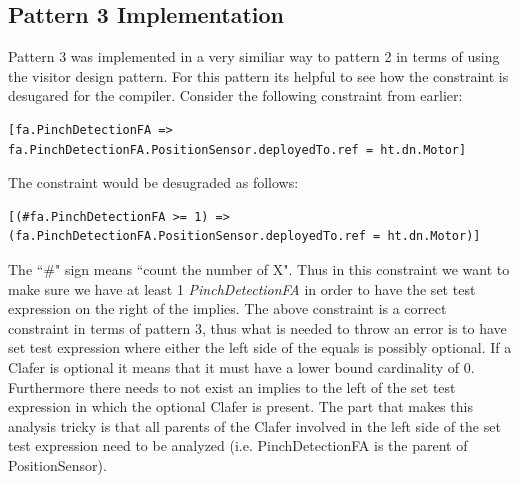 \documentclass[10pt,oneside]{IEEEtran}
\begin{document}
\subsection{Pattern 3 Implementation}
Pattern 3 was implemented in a very similiar way to pattern 2 in terms of using the visitor design pattern. For this pattern its helpful to see how the constraint is desugared for the compiler. Consider the following constraint from earlier:
\begin{lstlisting}[]
[fa.PinchDetectionFA => fa.PinchDetectionFA.PositionSensor.deployedTo.ref = ht.dn.Motor]
\end{lstlisting}
The constraint would be desugraded as follows:
\begin{lstlisting}[]
[(#fa.PinchDetectionFA >= 1) => (fa.PinchDetectionFA.PositionSensor.deployedTo.ref = ht.dn.Motor)]
\end{lstlisting}
The ``\#" sign means ``count the number of X". Thus in this constraint we want to make sure we have at least 1 \textit{PinchDetectionFA} in order to have the set test expression on the right of the implies. The above constraint is a correct constraint in terms of pattern 3, thus what is needed to throw an error is to have set test expression where either the left side of the equals is possibly optional. If a Clafer is optional it means that it must have a lower bound cardinality of 0. Furthermore there needs to not exist an implies to the left of the set test expression in which the optional Clafer is present. The part that makes this analysis tricky is that all parents of the Clafer involved in the left side of the set test expression need to be analyzed (i.e. PinchDetectionFA is the parent of PositionSensor).
\end{document}
